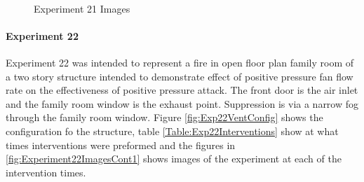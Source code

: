 \documentclass{article}
\begin{document}
\begin{figure}[H]
	\ContinuedFloat 
	\centering 
	 \ 
	\caption{Experiment 21 Images}
	\label{fig:Experiment21ImagesCont3} 
\end{figure}

\paragraph{Experiment 22}\mbox{}

Experiment 22 was intended to represent a fire in open floor plan family room of a two story structure intended to demonstrate effect of positive pressure fan flow rate on the effectiveness of positive pressure attack. The front door is the air inlet and the family room window is the exhaust point. Suppression is via a narrow fog through the family room window. Figure \ref{fig:Exp22VentConfig} shows the configuration fo the structure, table \ref{Table:Exp22Interventions} show at what times interventions were preformed and the figures in \ref{fig:Experiment22ImagesCont1} shows images of the experiment at each of the intervention times.
\end{document}
